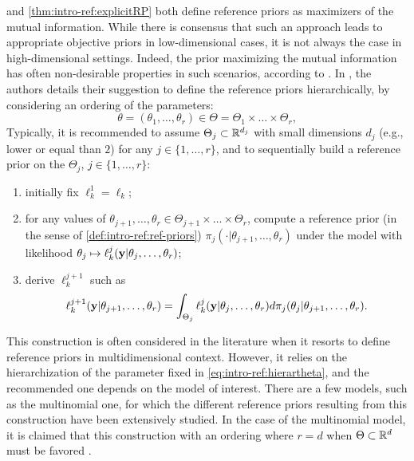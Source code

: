  and \cref{thm:intro-ref:explicitRP}
both define reference priors as maximizers of the mutual information.
While there is consensus that such an approach leads to appropriate objective priors in low-dimensional cases, it is not always the case in high-dimensional settings.
Indeed, the prior maximizing the mutual information has often non-desirable properties in such scenarios, according to \citet{berger_overall_2015}. %
In \cite{berger_development_1992}, the authors details their suggestion to define the reference priors hierarchically, by considering an ordering of the parameters:
 \begin{equation}\label{eq:intro-ref:hierartheta}
     \theta = (\theta_1,\dots,\theta_r) \in \Theta=\Theta_1\times\dots\times\Theta_r,
 \end{equation}
Typically, it is recommended to assume $\Theta_j\subset\mathbb{R}^{d_j}$ with small dimensions $d_j$ (e.g., lower or equal than $2$) for any $j\in\{1,\dots,r\}$, and to sequentially build a reference prior on the $\Theta_j$,  $j\in\{1,\dots,r\}$:
 \begin{enumerate}
     \item initially fix $\ell_k^1=\ell_k$;
     \item for any values of $\theta_{j+1},\dots,\theta_r\in\Theta_{j+1}\times\dots\times\Theta_r$, compute a reference prior (in the sense of \cref{def:intro-ref:ref-priors}) $\pi_j(\cdot|\theta_{j+1},\dots,\theta_r)$ under the model with likelihood $\theta_j\mapsto\ell_k^j(\mathbf{y}|\theta_j,\dots,\theta_r)$;
     \item derive $\ell_k^{j+1}$ such as 
         \begin{equation}\label{eq:hier:condlikeint}
            \ell_k^{j+1}(\mathbf{y}|\theta_{j+1},\dots,\theta_r) =  \int_{\Theta_j}\ell_k^j(\mathbf{y}|\theta_j,\dots,\theta_r)d\pi_j(\theta_j|\theta_{j+1},\dots,\theta_r).
         \end{equation}
 \end{enumerate}


This construction is often considered in the literature when it resorts to define reference priors in multidimensional context. 
However, it relies on the hierarchization of the parameter fixed in \cref{eq:intro-ref:hierartheta}, and the recommended  one depends on the model of interest.
There are a few models, such as the multinomial one, for which the different reference priors resulting from this construction have been extensively studied. In the case of the multinomial model, it is claimed that this construction with an ordering where $r=d$ when $\Theta\subset\mathbb{R}^d$ must be favored  \citep{berger_ordered_1992,berger_overall_2015}.




